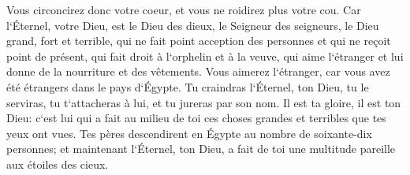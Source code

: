 \verse Vous circoncirez donc votre coeur, et vous ne roidirez plus votre cou. 
\verse Car l`Éternel, votre Dieu, est le Dieu des dieux, le Seigneur des seigneurs, le Dieu grand, fort et terrible, qui ne fait point acception des personnes et qui ne reçoit point de présent, 
\verse qui fait droit à l`orphelin et à la veuve, qui aime l`étranger et lui donne de la nourriture et des vêtements. 
\verse Vous aimerez l`étranger, car vous avez été étrangers dans le pays d`Égypte. 
\verse Tu craindras l`Éternel, ton Dieu, tu le serviras, tu t`attacheras à lui, et tu jureras par son nom. 
\verse Il est ta gloire, il est ton Dieu: c`est lui qui a fait au milieu de toi ces choses grandes et terribles que tes yeux ont vues. 
\verse Tes pères descendirent en Égypte au nombre de soixante-dix personnes; et maintenant l`Éternel, ton Dieu, a fait de toi une multitude pareille aux étoiles des cieux. 

